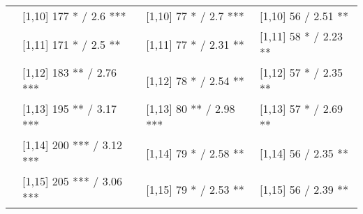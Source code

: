 \begin{table}
\begin{tabular}[t]{llll}
 & {}[1,10] 177 * / 2.6 *** & {}[1,10] 77 * / 2.7 *** & {}[1,10] 56  / 2.51 **\\
 & {}[1,11] 171 * / 2.5 ** & {}[1,11] 77 * / 2.31 ** & {}[1,11] 58 * / 2.23 **\\
 & {}[1,12] 183 ** / 2.76 *** & {}[1,12] 78 * / 2.54 ** & {}[1,12] 57 * / 2.35 **\\
\addlinespace
 & {}[1,13] 195 ** / 3.17 *** & {}[1,13] 80 ** / 2.98 *** & {}[1,13] 57 * / 2.69 **\\
 & {}[1,14] 200 *** / 3.12 *** & {}[1,14] 79 * / 2.58 ** & {}[1,14] 56  / 2.35 **\\
 & {}[1,15] 205 *** / 3.06 *** & {}[1,15] 79 * / 2.53 ** & {}[1,15] 56  / 2.39 **\\
\bottomrule
\end{tabular}
\end{table}
